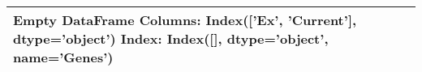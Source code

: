 \begin{tabular}{lcc}
\toprule
Empty DataFrame
Columns: Index(['Ex', 'Current'], dtype='object')
Index: Index([], dtype='object', name='Genes') \\
\bottomrule
\end{tabular}
